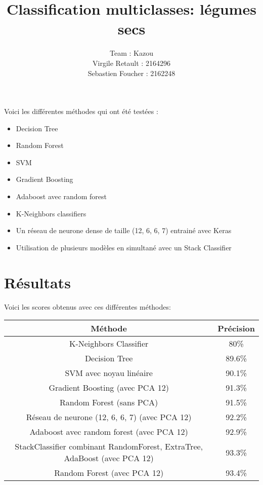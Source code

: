 \documentclass[12pt]{article}
\title{Classification multiclasses: légumes secs}
\author{
  Team : Kazou\\
  Virgile Retault : 2164296\\
  Sebastien Foucher : 2162248
}
\begin{document}
\maketitle

\section*{}
\newpage
Voici les différentes méthodes qui ont été testées :

\begin{itemize}
	\item Decision Tree
	\item Random Forest
	\item SVM
	\item Gradient Boosting
	\item Adaboost avec random forest
	\item K-Neighbors classifiers
	\item Un réseau de neurone dense de taille (12, 6, 6, 7) entrainé avec Keras
	\item Utilisation de plusieurs modèles en simultané avec un Stack Classifier
	
\end{itemize}


\section*{Résultats}

Voici les scores obtenus avec ces différentes méthodes:
\begin{center}
	\begin{tabular}{ |c|c| }
		\hline
		Méthode & Précision \\\hline\hline
	  K-Neighbors Classifier & 80\% \\\hline
		Decision Tree & 89.6\% \\\hline
		SVM avec noyau linéaire & 90.1\% \\\hline
		Gradient Boosting (avec PCA 12) & 91.3\% \\\hline
		Random Forest (sans PCA) & 91.5\% \\\hline
		Réseau de neurone (12, 6, 6, 7) (avec PCA 12) & 92.2\% \\\hline
		Adaboost avec random forest (avec PCA 12) & 92.9\% \\\hline
		StackClassifier combinant RandomForest, ExtraTree, AdaBoost (avec PCA 12) & 93.3\% \\\hline
		Random Forest (avec PCA 12) & 93.4\% \\\hline

	\end{tabular} 
\end{center}
\end{document}
